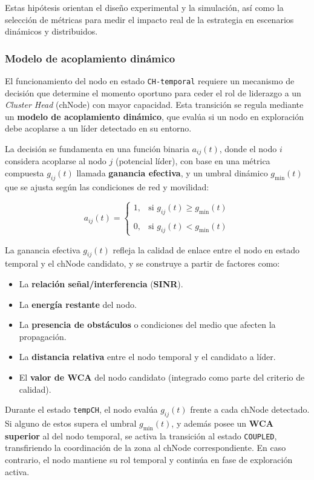\documentclass{article}
\begin{document}
Estas hipótesis orientan el diseño experimental y la simulación, así como la selección de métricas para medir el impacto real de la estrategia en escenarios dinámicos y distribuidos.

\subsubsection{Modelo de acoplamiento dinámico}
El funcionamiento del nodo en estado \texttt{CH-temporal} requiere un mecanismo de decisión que determine el momento oportuno para ceder el rol de liderazgo a un \textit{Cluster Head} (chNode) con mayor capacidad. Esta transición se regula mediante un \textbf{modelo de acoplamiento dinámico}, que evalúa si un nodo en exploración debe acoplarse a un líder detectado en su entorno.

La decisión se fundamenta en una función binaria $a_{ij}(t)$, donde el nodo $i$ considera acoplarse al nodo $j$ (potencial líder), con base en una métrica compuesta $g_{ij}(t)$ llamada \textbf{ganancia efectiva}, y un umbral dinámico $g_{\min}(t)$ que se ajusta según las condiciones de red y movilidad:

\[
a_{ij}(t) =
\begin{cases}
1, & \text{si } g_{ij}(t) \geq g_{\min}(t) \\\\
0, & \text{si } g_{ij}(t) < g_{\min}(t)
\end{cases}
\]

La ganancia efectiva $g_{ij}(t)$ refleja la calidad de enlace entre el nodo en estado temporal y el chNode candidato, y se construye a partir de factores como:

\begin{itemize}
    \item La \textbf{relación señal/interferencia} (\textbf{SINR}).
    \item La \textbf{energía restante} del nodo.
    \item La \textbf{presencia de obstáculos} o condiciones del medio que afecten la propagación.
    \item La \textbf{distancia relativa} entre el nodo temporal y el candidato a líder.
    \item El \textbf{valor de WCA} del nodo candidato (integrado como parte del criterio de calidad).
\end{itemize}

Durante el estado \texttt{tempCH}, el nodo evalúa $g_{ij}(t)$ frente a cada chNode detectado. Si alguno de estos supera el umbral $g_{\min}(t)$, y además posee un \textbf{WCA superior} al del nodo temporal, se activa la transición al estado \texttt{COUPLED}, transfiriendo la coordinación de la zona al chNode correspondiente. En caso contrario, el nodo mantiene su rol temporal y continúa en fase de exploración activa.
\end{document}
